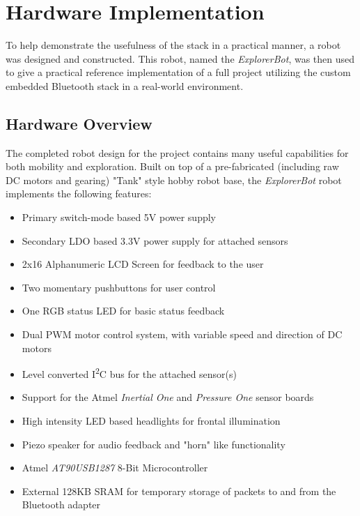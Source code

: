 \chapter{Hardware Implementation}
\label{Chapter 4}

To help demonstrate the usefulness of the stack in a practical manner, a robot was designed and constructed. This robot, named the \emph{ExplorerBot}, was then used to give a practical reference implementation of a full project utilizing the custom embedded Bluetooth stack in a real-world environment.

\section{Hardware Overview}

The completed robot design for the project contains many useful capabilities for both mobility and exploration. Built on top of a pre-fabricated (including raw DC motors and gearing) "Tank" style hobby robot base, the \emph{ExplorerBot} robot implements the following features:

\begin{itemize}
	\item Primary switch-mode based 5V power supply
	\item Secondary LDO based 3.3V power supply for attached sensors
	\item 2x16 Alphanumeric LCD Screen for feedback to the user
	\item Two momentary pushbuttons for user control
	\item One RGB status LED for basic status feedback
	\item Dual PWM motor control system, with variable speed and direction of DC motors
	\item Level converted I\textsuperscript{2}C bus for the attached sensor(s)
	\item Support for the Atmel \textit{Inertial One} and \textit{Pressure One} sensor boards
	\item High intensity LED based headlights for frontal illumination
	\item Piezo speaker for audio feedback and "horn" like functionality
	\item Atmel \textit{AT90USB1287} 8-Bit Microcontroller
	\item External 128KB SRAM for temporary storage of packets to and from the Bluetooth adapter
\end{itemize}

